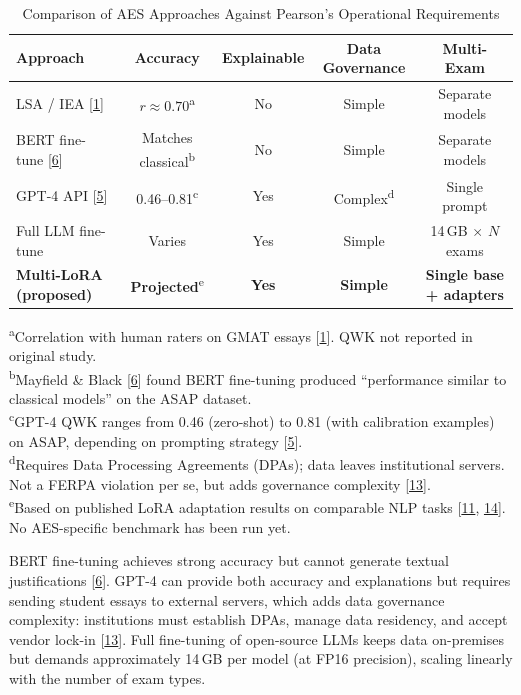 \documentclass[12pt]{article}
\begin{document}
\begin{table}[H]
\centering
\caption{Comparison of AES Approaches Against Pearson's Operational Requirements}
\label{tab:comparison}
\begin{tabular}{@{} l c c c c @{}}
\toprule
\textbf{Approach} & \textbf{Accuracy} & \textbf{Explainable} & \textbf{Data Governance} & \textbf{Multi-Exam} \\
\midrule
LSA / IEA [\hyperlink{ref1}{1}]          & $r \approx 0.70$\textsuperscript{a} & No  & Simple & Separate models \\
BERT fine-tune [\hyperlink{ref6}{6}]     & Matches classical\textsuperscript{b} & No  & Simple & Separate models \\
GPT-4 API [\hyperlink{ref5}{5}]          & 0.46--0.81\textsuperscript{c} & Yes & Complex\textsuperscript{d} & Single prompt \\
Full LLM fine-tune                       & Varies & Yes & Simple & 14\,GB $\times$ $N$ exams \\
\textbf{Multi-LoRA (proposed)}           & \textbf{Projected}\textsuperscript{e} & \textbf{Yes} & \textbf{Simple} & \textbf{Single base + adapters} \\
\bottomrule
\end{tabular}

\vspace{6pt}
{\footnotesize
\textsuperscript{a}Correlation with human raters on GMAT essays [\hyperlink{ref1}{1}]. QWK not reported in original study.\\
\textsuperscript{b}Mayfield \& Black [\hyperlink{ref6}{6}] found BERT fine-tuning produced ``performance similar to classical models'' on the ASAP dataset.\\
\textsuperscript{c}GPT-4 QWK ranges from 0.46 (zero-shot) to 0.81 (with calibration examples) on ASAP, depending on prompting strategy [\hyperlink{ref5}{5}].\\
\textsuperscript{d}Requires Data Processing Agreements (DPAs); data leaves institutional servers. Not a FERPA violation per se, but adds governance complexity [\hyperlink{ref13}{13}].\\
\textsuperscript{e}Based on published LoRA adaptation results on comparable NLP tasks [\hyperlink{ref11}{11}, \hyperlink{ref14}{14}]. No AES-specific benchmark has been run yet.
}
\end{table}

BERT fine-tuning achieves strong accuracy but cannot generate textual justifications [\hyperlink{ref6}{6}]. GPT-4 can provide both accuracy and explanations but requires sending student essays to external servers, which adds data governance complexity: institutions must establish DPAs, manage data residency, and accept vendor lock-in [\hyperlink{ref13}{13}]. Full fine-tuning of open-source LLMs keeps data on-premises but demands approximately 14\,GB per model (at FP16 precision), scaling linearly with the number of exam types.
\end{document}
